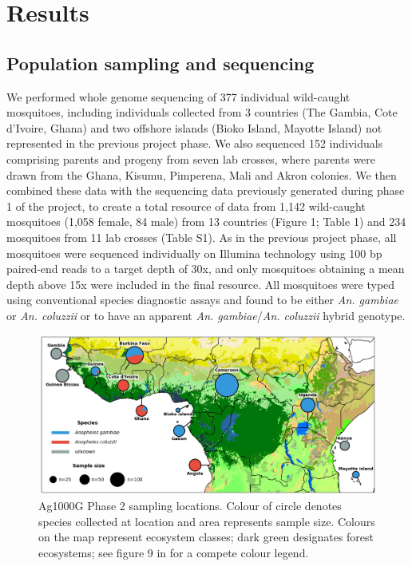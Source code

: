 \documentclass[a4paper,11pt,abstracton,hidelinks]{scrartcl}
\begin{document}
\section*{Results}


\subsection*{Population sampling and sequencing}


%
We performed whole genome sequencing of 377 individual wild-caught mosquitoes, including individuals collected from 3 countries (The Gambia, Cote d'Ivoire, Ghana) and two offshore islands (Bioko Island, Mayotte Island) not represented in the previous project phase. 
%
We also sequenced 152 individuals comprising parents and progeny from seven lab crosses, where parents were drawn from the Ghana, Kisumu, Pimperena, Mali and Akron colonies. 
%
We then combined these data with the sequencing data previously generated during phase 1 of the project, to create a total resource of data from 1,142 wild-caught mosquitoes (1,058 female, 84 male) from 13 countries (Figure 1; Table 1) and 234 mosquitoes from 11 lab crosses (Table S1). 
%
As in the previous project phase, all mosquitoes were sequenced individually on Illumina technology using 100 bp paired-end reads to a target depth of 30x, and only mosquitoes obtaining a mean depth above 15x were included in the final resource. 
%
All mosquitoes were typed using conventional species diagnostic assays \cite{scott1993, fanello2002, santolamazza2008} and found to be either \textit{An. gambiae} or \textit{An. coluzzii} or to have an apparent \textit{An. gambiae}/\textit{An. coluzzii} hybrid genotype. 


\begin{figure}[H]
	\begin{center}
		\includegraphics*[width=5.8in]{artwork/collection_site_map.jpg}
	\end{center}
	\caption{Ag1000G Phase 2 sampling locations. Colour of circle denotes species collected at location and area represents sample size. Colours on the map represent ecosystem classes; dark green designates forest ecosystems; see figure 9 in \cite{sayre2013} for a compete colour legend.}
	\label{sample_map}
\end{figure}
\end{document}
